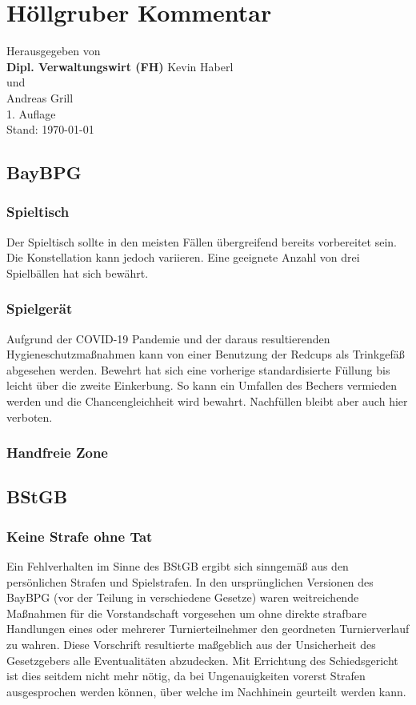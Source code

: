 \documentclass[a5paper, 12pt]{article}
\begin{document}
\section{\centering Höllgruber Kommentar}
\begin{center}
Herausgegeben von \linebreak
\\
\textbf{Dipl. Verwaltungswirt (FH)} \linebreak
Kevin Haberl \linebreak
\\
und \linebreak
\\
Andreas Grill\linebreak
\linebreak
\\
1. Auflage\linebreak
\\
Stand: \today
\end{center}
\newpage
\subsection{BayBPG}
\subsubsection{Spieltisch}
Der Spieltisch sollte in den meisten Fällen übergreifend bereits vorbereitet sein. Die Konstellation kann jedoch variieren. Eine geeignete Anzahl von drei Spielbällen hat sich bewährt.
\subsubsection{Spielgerät}
Aufgrund der COVID-19 Pandemie und der daraus resultierenden Hygieneschutzmaßnahmen kann von einer Benutzung der Redcups als Trinkgefäß abgesehen werden. Bewehrt hat sich eine vorherige standardisierte Füllung bis leicht über die zweite Einkerbung. So kann ein Umfallen des Bechers vermieden werden und die Chancengleichheit wird bewahrt. Nachfüllen bleibt aber auch hier verboten.
\subsubsection{Handfreie Zone}
\newpage
\subsection{BStGB}
\subsubsection{Keine Strafe ohne Tat}
Ein Fehlverhalten im Sinne des BStGB ergibt sich sinngemäß aus den persönlichen Strafen und Spielstrafen. In den ursprünglichen Versionen des BayBPG (vor der Teilung in verschiedene Gesetze) waren weitreichende Maßnahmen für die Vorstandschaft vorgesehen um ohne direkte strafbare Handlungen eines oder mehrerer Turnierteilnehmer den geordneten Turnierverlauf zu wahren. Diese Vorschrift resultierte maßgeblich aus der Unsicherheit des Gesetzgebers alle Eventualitäten abzudecken. Mit Errichtung des Schiedsgericht ist dies seitdem nicht mehr nötig, da bei Ungenauigkeiten vorerst Strafen ausgesprochen werden können, über welche im Nachhinein geurteilt werden kann.
\end{document}
